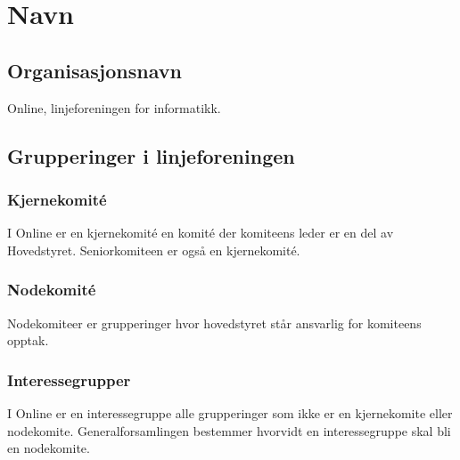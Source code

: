\chapter{Navn}
\section{Organisasjonsnavn}
\vspace{23pt}
Online, linjeforeningen for informatikk.




\section{Grupperinger i linjeforeningen}
\vspace{23pt}

\subsection{Kjernekomité}

I Online er en kjernekomité en komité der komiteens leder er en del av Hovedstyret. Seniorkomiteen er også en kjernekomité. 

\subsection{Nodekomité}

Nodekomiteer er grupperinger hvor hovedstyret står ansvarlig for komiteens opptak.


\subsection{Interessegrupper}

I Online er en interessegruppe alle grupperinger som ikke er en kjernekomite eller nodekomite. Generalforsamlingen bestemmer hvorvidt en interessegruppe skal bli en nodekomite.


